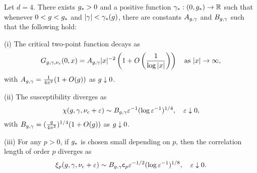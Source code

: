 \begin{theorem} \label{thm:suscept}
  Let $d = 4$.
  There exists $g_* > 0$
  and a positive function $\gamma_* : (0, g_*) \rightarrow {\mathbb R}$
  such that whenever $0 < g < g_*$ and $|\gamma| < \gamma_*(g)$,
  there are constants $A_{g,\gamma}$ and $B_{g,\gamma}$ such that the following hold:

  \smallskip\noindent
  (i)
  The critical two-point function decays as
  \begin{equation}
    G_{g,\gamma,\nu_c}(0, x)
        =
    A_{g,\gamma} |x|^{-2} \left(1 + O\left(\frac{1}{\log |x|}\right)\right)
        \quad
    \text{as $|x|\rightarrow\infty$},
  \end{equation}
  with $A_{g,\gamma} = \frac{1}{4 \pi^2} (1 + O(g))$ as $g \downarrow 0$.

  \smallskip\noindent
  (ii)
  The susceptibility diverges as
  \begin{equation} \label{e:chieps-asympt}
    \chi(g, \gamma, \nu_c + \varepsilon)
    \sim B_{g,\gamma} \varepsilon^{-1} (\log \varepsilon^{-1})^{1/4},
    \quad \varepsilon\downarrow 0,
  \end{equation}
  with $B_{g,\gamma} = (\frac{g}{4 \pi^2})^{1/4} (1 + O(g))$ as $g \downarrow 0$.

  \smallskip\noindent
  (iii) For any $p >0$,
  if $g_*$ is chosen small depending on $p$, then
  the correlation length of order $p$ diverges as
  \begin{equation} \label{e:xieps-asympt}
    \xi_p(g, \gamma, \nu_c + \varepsilon)
     \sim B_{g,\gamma} {\sf c}_p \varepsilon^{-1/2} (\log \varepsilon^{-1})^{1/8},
     \quad \varepsilon\downarrow 0.
  \end{equation}
\end{theorem}